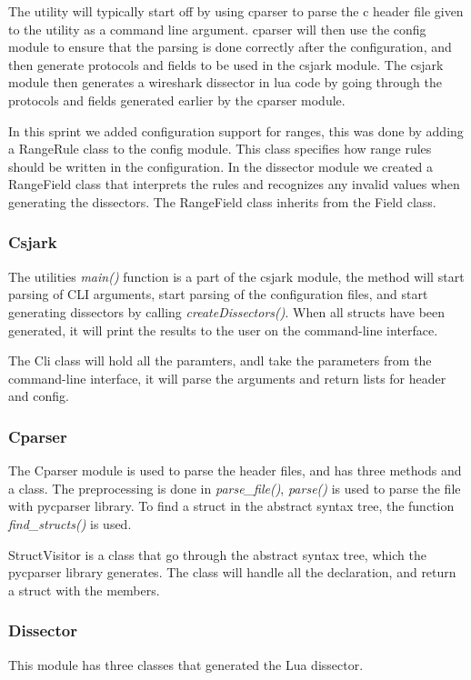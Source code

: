The \gls{utility} will typically start off by using cparser to parse the \Gls{c} \gls{header} file given to
the \gls{utility} as a command line argument. cparser will then use the config module
to ensure that the parsing is done correctly after the configuration, and then
generate protocols and fields to be used in the csjark module. The csjark
module then generates a \Gls{wireshark} \gls{dissector} in \Gls{lua} code by going through the
protocols and fields generated earlier by the cparser module.

In this sprint we added configuration support for ranges, this was done 
by adding a RangeRule class to the config module. This class specifies how
range rules should be written in the configuration. In the \gls{dissector} module
we created a RangeField class that interprets the rules
and recognizes any invalid values when generating the \glspl{dissector}.
The RangeField class inherits from the Field class.

\subsubsection{Csjark}
The utilities \emph{main()} function is a part of the csjark module, the method will start parsing of CLI arguments, start parsing of the configuration files, and start generating dissectors by calling \emph{createDissectors()}. When all structs have been generated, it will print the results to the user on the command-line interface.

The Cli class will hold all the paramters, andl take the parameters from the command-line interface, it will parse the arguments and return lists for header and config.

\subsubsection{Cparser}
The Cparser module is used to parse the header files, and has three methods and a class. The preprocessing is done in \emph{parse\_file()}, \emph{parse()} is used to parse the file with pycparser library. To find a struct in the abstract syntax tree, the function \emph{find\_structs()} is used.

StructVisitor is a class that go through the abstract syntax tree, which the pycparser library generates. The class will handle all the declaration, and return a struct with the members.

\subsubsection{Dissector}
This module has three classes that generated the Lua dissector.

